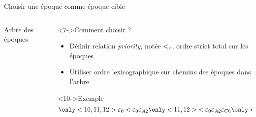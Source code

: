 \begin{frame}{Choisir une époque comme époque cible}
\begin{columns}
\begin{column}{0.3 \textwidth}
\begin{block}{Arbre des époques}
\begin{figure}
{
          }
        \end{figure}
      \end{block}
    \end{column}
    \begin{column}{0.7 \textwidth}
      \vspace{-2.5em}
      \begin{block}<7->{Comment choisir ?}
        \begin{itemize}
          \item<8-> Définir relation \emph{priority}, notée $<_{\varepsilon}$, ordre strict total sur les époques
          \item<9-> Utiliser \alert{ordre lexicographique sur chemins} des époques dans l'arbre
        \end{itemize}
      \end{block}
      \vspace{-1em}
      \begin{block}<10->{Exemple}
        \begin{equation*}
          \only<10,11,12>{\epoch{0} < \epoch{0}\epoch{A2}}
          \only<11,12>{< \epoch{0}\epoch{A2}\epoch{C6}}
          \only<12>{< \epoch{0}\epoch{B3}\epoch{B7}}
        \end{equation*}
      \end{block}
    \end{column}
  \end{columns}
\end{frame}

